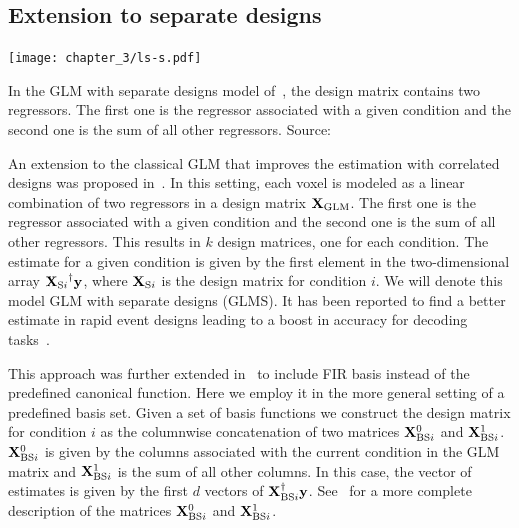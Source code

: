 
\subsection{Extension to separate designs}

\begin{marginfigure}[8cm]
\center \texttt{[image: chapter\_3/ls-s.pdf]}
\caption{In the GLM with separate designs model of~\citet{Mumford2012}, the design matrix contains two regressors. The first one is the
regressor associated with a given condition and the second one is the sum of all
other regressors. Source: \citep{Turner2012}}
\end{marginfigure}

An extension to the classical GLM that improves the estimation with correlated
designs was proposed in~\citep{Mumford2012}.
In this setting, each voxel is modeled as a linear combination of two
regressors in a design matrix $\mathbf{X}_\text{GLM}$. The first one is the
regressor associated with a given condition and the second one is the sum of all
other regressors. This results in $k$ design matrices, one for each condition.
The estimate for a given condition is given by the first element in the two-dimensional
array ${\mathbf{X}_{\text{S}i}}^{\dagger} \mathbf{y}$, 
where $\mathbf{X}_{\text{S}i}$ is the design matrix for
condition $i$. We will 
denote this model GLM with separate designs (GLMS). It has been reported to find
a better estimate in rapid event designs leading to a boost in accuracy for
decoding tasks~\citep{Mumford2012, Schoenmakers2013, Lei2013}.

This approach was further extended in~\citep{Turner2012} to
include FIR basis instead of the predefined canonical function. Here we employ it 
in the more general setting of a  
predefined basis set. Given a set of basis
functions we construct the design matrix for condition $i$ as the columnwise
concatenation of two matrices $\mathbf{X}^0_{\text{BS}i}$ and $\mathbf{X}^1_{\text{BS}i}$.
$\mathbf{X}^0_{\text{BS}i}$ is given by the columns associated
with the current condition in the GLM matrix and $\mathbf{X}^1_{\text{BS}i}$ is
the sum of all other columns.
In this case, the vector of estimates is given by the first $d$ vectors of
$\mathbf{X}_{\text{BS}i}^{\dagger} \mathbf{y}$. See~\citep{Turner2012} for a more complete description of the matrices $\mathbf{X}^0_{\text{BS}i}$ and $\mathbf{X}^1_{\text{BS}i}$.


